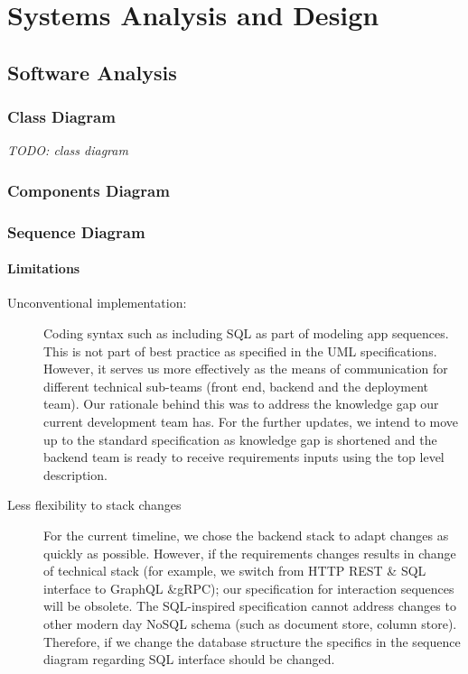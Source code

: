 %
%
\chapter{Systems Analysis and Design}

\section{Software Analysis}

\subsection{Class Diagram}

\textit{TODO: class diagram}

\subsection{Components Diagram}

\subsection{Sequence Diagram}

\subsubsection{Limitations}

\begin{description}
	\item[Unconventional implementation:] Coding syntax such as including SQL as part of modeling app sequences. This is not part of best practice as specified in the UML specifications. However, it serves us more effectively as the means of communication for different technical sub-teams (front end, backend and the deployment team). Our rationale behind this was to address the knowledge gap our current development team has. For the further updates, we intend to move up to the standard specification as knowledge gap is shortened and the backend team is ready to receive requirements inputs using the top level description.
	\item[Less flexibility to stack changes] For the current timeline, we chose the backend stack to adapt changes as quickly as possible. However, if the requirements changes results in change of technical stack (for example, we switch from HTTP REST \& SQL interface to GraphQL \&gRPC); our specification for interaction sequences will be obsolete. The SQL-inspired specification cannot address changes to other modern day NoSQL schema (such as document store, column store). Therefore, if we change the database structure the specifics in the sequence diagram regarding SQL interface should be changed.
\end{description}

